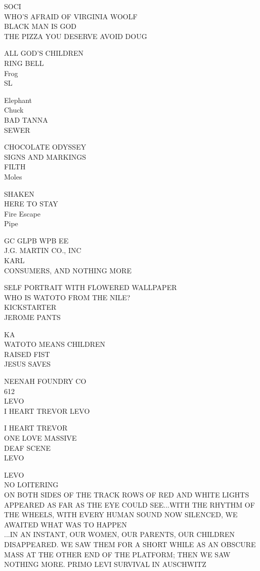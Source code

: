 \documentclass[10pt,letterpaper]{article}
\begin{document}
SOCI\\
WHO'S AFRAID OF VIRGINIA WOOLF\\
BLACK MAN IS GOD\\
THE PIZZA YOU DESERVE AVOID DOUG

ALL GOD'S CHILDREN\\
RING BELL\\
Frog\\
SL

Elephant\\
Chuck\\
BAD TANNA\\
SEWER

CHOCOLATE ODYSSEY\\
SIGNS AND MARKINGS\\
FILTH\\
Moles

SHAKEN\\
HERE TO STAY\\
Fire Escape\\
Pipe

GC GLPB WPB EE\\
J.G. MARTIN CO., INC\\
KARL\\
CONSUMERS, AND NOTHING MORE

SELF PORTRAIT WITH FLOWERED WALLPAPER\\
WHO IS WATOTO FROM THE NILE?\\
KICKSTARTER\\
JEROME PANTS

KA\\
WATOTO MEANS CHILDREN\\
RAISED FIST\\
JESUS SAVES

NEENAH FOUNDRY CO\\
612\\
LEVO\\
I HEART TREVOR LEVO

I HEART TREVOR\\
ONE LOVE MASSIVE\\
DEAF SCENE\\
LEVO

LEVO\\
NO LOITERING\\
ON BOTH SIDES OF THE TRACK ROWS OF RED AND WHITE LIGHTS APPEARED AS FAR AS THE EYE COULD SEE...WITH THE RHYTHM OF THE WHEELS, WITH EVERY HUMAN SOUND NOW SILENCED, WE AWAITED WHAT WAS TO HAPPEN\\
...IN AN INSTANT, OUR WOMEN, OUR PARENTS, OUR CHILDREN DISAPPEARED.  WE SAW THEM FOR A SHORT WHILE AS AN OBSCURE MASS AT THE OTHER END OF THE PLATFORM; THEN WE SAW NOTHING MORE.  PRIMO LEVI  SURVIVAL IN AUSCHWITZ
\end{document}
